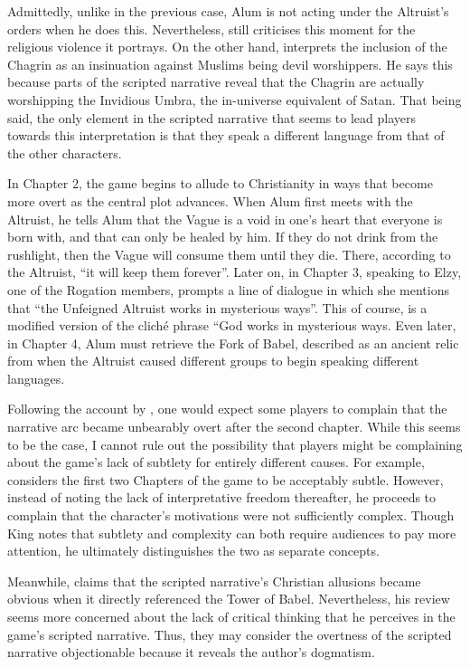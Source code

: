 Admittedly, unlike in the previous case, Alum is not acting under the Altruist's orders when he does this. Nevertheless, \textcite[9:27]{innuendo_studios_co-vids_2020} still criticises this moment for the religious violence it portrays. On the other hand, \textcite[Cons section, para.~3]{virotti_review_2017} interprets the inclusion of the Chagrin as an insinuation against Muslims being devil worshippers. He says this because parts of the scripted narrative reveal that the Chagrin are actually worshipping the Invidious Umbra, the in-universe equivalent of Satan. That being said, the only element in the scripted narrative that seems to lead players towards this interpretation is that they speak a different language from that of the other characters.

In Chapter 2, the game begins to allude to Christianity in ways that become more overt as the central plot advances. When Alum first meets with the Altruist, he tells Alum that the Vague is a void in one's heart that everyone is born with, and that can only be healed by him. If they do not drink from the rushlight, then the Vague will consume them until they die. There, according to the Altruist, ``it will keep them forever''. Later on, in Chapter 3, speaking to Elzy, one of the Rogation members, prompts a line of dialogue in which she mentions that ``the Unfeigned Altruist works in mysterious ways''. This of course, is a modified version of the cliché phrase ``God works in mysterious ways. Even later, in Chapter 4, Alum must retrieve the Fork of Babel, described as an ancient relic from when the Altruist caused different groups to begin speaking different languages.

Following the account by \textcite{king_virtue_2017}, one would expect some players to complain that the narrative arc became unbearably overt after the second chapter. While this seems to be the case, I cannot rule out the possibility that players might be complaining about the game's lack of subtlety for entirely different causes. For example, \textcite[para. 4]{kevintheradioguy_review_2015} considers the first two Chapters of the game to be acceptably subtle. However, instead of noting the lack of interpretative freedom thereafter, he proceeds to complain that the character's motivations were not sufficiently complex. Though King notes that subtlety and complexity can both require audiences to pay more attention, he ultimately distinguishes the two as separate concepts.

Meanwhile, \textcite{adam_review_2015} claims that the scripted narrative's Christian allusions became obvious when it directly referenced the Tower of Babel. Nevertheless, his review seems more concerned about the lack of critical thinking that he perceives in the game's scripted narrative. Thus, they may consider the overtness of the scripted narrative objectionable because it reveals the author's dogmatism.

